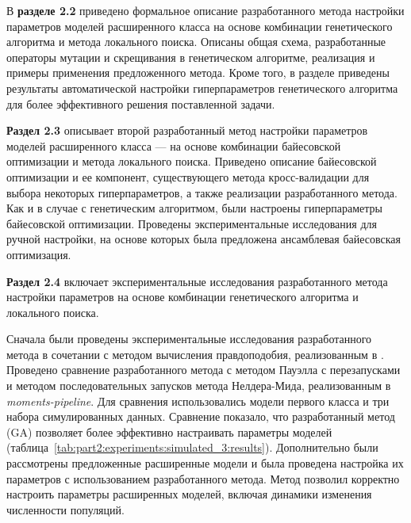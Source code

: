 В \textbf{разделе 2.2} приведено формальное описание разработанного метода настройки параметров моделей расширенного класса на основе комбинации генетического алгоритма и метода локального поиска.
Описаны общая схема, разработанные операторы мутации и скрещивания в генетическом алгоритме, реализация и примеры применения предложенного метода.
Кроме того, в разделе приведены результаты автоматической настройки гиперпараметров генетического алгоритма для более эффективного решения поставленной задачи.

\textbf{Раздел 2.3} описывает второй разработанный метод настройки параметров моделей расширенного класса --- на основе комбинации байесовской оптимизации и метода локального поиска.
Приведено описание байесовской оптимизации и ее компонент, существующего метода кросс-валидации для выбора некоторых гиперпараметров, а также реализации разработанного метода.
Как и в случае с генетическим алгоритмом, были настроены гиперпараметры байесовской оптимизации.
Проведены экспериментальные исследования для ручной настройки, на основе которых была предложена ансамблевая байесовская оптимизация.

\textbf{Раздел 2.4} включает экспериментальные исследования разработанного метода настройки параметров на основе комбинации генетического алгоритма и локального поиска.

Сначала были проведены экспериментальные исследования разработанного метода в сочетании с методом вычисления правдоподобия, реализованным в \moments.
Проведено сравнение разработанного метода с методом Пауэлла с перезапусками и методом последовательных запусков метода Нелдера-Мида, реализованным в \textit{moments-pipeline}.
Для сравнения использовались модели первого класса и три набора симулированных данных.
Сравнение показало, что разработанный метод (GA) позволяет более эффективно настраивать параметры моделей (таблица~\ref{tab:part2:experiments:simulated_3:results}).
Дополнительно были рассмотрены предложенные расширенные модели и была проведена настройка их параметров с использованием разработанного метода.
Метод позволил корректно настроить параметры расширенных моделей, включая динамики изменения численности популяций.

